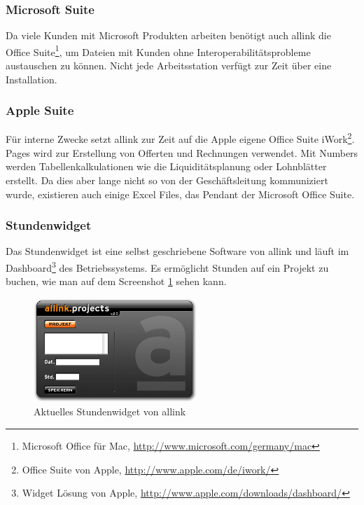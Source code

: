 \subsubsection{Microsoft Suite}
Da viele Kunden mit Microsoft Produkten arbeiten benötigt auch allink die
Office Suite\footnote{Microsoft Office für Mac, \url{http://www.microsoft.com/germany/mac}}, 
um Dateien mit Kunden ohne Interoperabilitätsprobleme
austauschen zu können. Nicht jede Arbeitsstation verfügt zur Zeit über eine
Installation.

\subsubsection{Apple Suite}
Für interne Zwecke setzt allink zur Zeit auf die Apple eigene Office Suite
iWork\footnote{Office Suite von Apple, \url{http://www.apple.com/de/iwork/}}.
Pages wird zur Erstellung von Offerten und Rechnungen verwendet. Mit Numbers
werden Tabellenkalkulationen wie die Liquiditätsplanung oder Lohnblätter erstellt.
Da dies aber lange nicht so von der Geschäftsleitung kommuniziert wurde, existieren
auch einige Excel Files, das Pendant der Microsoft Office Suite.

\subsubsection{Stundenwidget}
Das Stundenwidget ist eine selbst geschriebene Software von allink und läuft
im Dashboard\footnote{Widget Lösung von Apple, \url{http://www.apple.com/downloads/dashboard/}} des Betriebssystems.
Es ermöglicht Stunden auf ein Projekt zu buchen, wie man auf dem Screenshot \ref{pic:ist_widget}
sehen kann.

\begin{figure}[htbp]
\begin{center}
\includegraphics[width=0.55\textwidth,angle=0]{./bilder/analyse/ist_widget.png}
\caption{Aktuelles Stundenwidget von allink}
\label{pic:ist_widget}
\end{center}
\end{figure}

